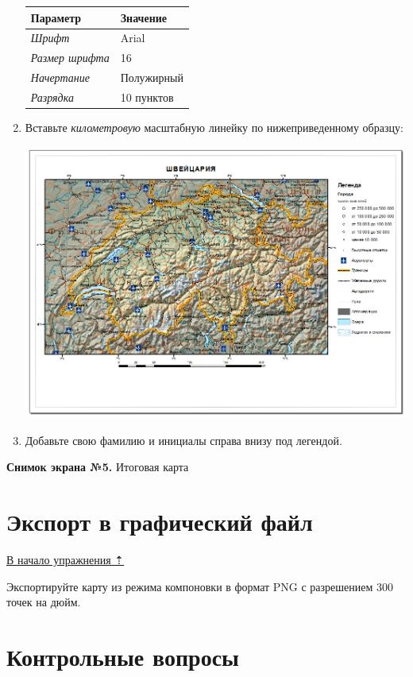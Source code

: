 \documentclass[]{book}
\theoremstyle{definition}
\theoremstyle{definition}
\theoremstyle{definition}
\theoremstyle{remark}
\begin{document}
\begin{enumerate}
  \begin{longtable}[]{@{}ll@{}}
  \toprule
  Параметр & Значение\tabularnewline
  \midrule
  \endhead
  \emph{Шрифт} & Arial\tabularnewline
  \emph{Размер шрифта} & 16\tabularnewline
  \emph{Начертание} & Полужирный\tabularnewline
  \emph{Разрядка} & 10 пунктов\tabularnewline
  \bottomrule
  \end{longtable}
\item
  Вставьте \emph{километровую} масштабную линейку по нижеприведенному
  образцу:

  \includegraphics{images/Ex02/image28.png}
\item
  Добавьте свою фамилию и инициалы справа внизу под легендой.
\end{enumerate}

\textbf{Снимок экрана №5.} Итоговая карта

\hypertarget{map-design-general-export}{%
\section{Экспорт в графический файл}\label{map-design-general-export}}

\protect\hyperlink{map-design-general}{В начало упражнения ⇡}

Экспортируйте карту из режима компоновки в формат PNG с разрешением 300
точек на дюйм.

\hypertarget{map-design-general-questions}{%
\section{Контрольные вопросы}\label{map-design-general-questions}}
\end{document}
